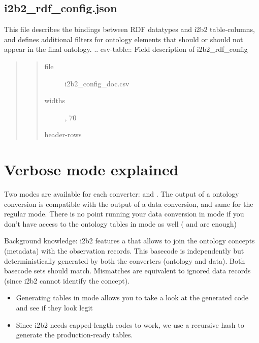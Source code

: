 \documentclass[letterpaper,10pt,english]{sphinxmanual}
\begin{document}
\subsection{i2b2\_rdf\_config.json}
\label{\detokenize{configuration:i2b2-rdf-config-json}}
This file describes the bindings between RDF datatypes and i2b2 table-columns, and defines additional filters for ontology elements that should or should not appear in the final ontology.
.. csv-table:: Field description of i2b2\_rdf\_config
\begin{quote}
\begin{quote}\begin{description}
\item[{file}] \leavevmode
i2b2\_config\_doc.csv

\item[{widths}] , 70

\item[{header-rows}] 

\end{description}\end{quote}
\end{quote}


\section{Verbose mode explained}
\label{\detokenize{verbose:verbose-mode-explained}}\label{\detokenize{verbose:verbose}}\label{\detokenize{verbose::doc}}
Two modes are available for each converter:  and . The output of a  ontology conversion is compatible with the output of a  data conversion, and same for the regular mode.
 There is no point running your data conversion in  mode if you don’t have access to the ontology tables in  mode as well ( and  are enough)

Background knowledge: i2b2 features a  that allows to join the ontology concepts (metadata) with the observation records. This basecode is independently but deterministically generated by both the converters (ontology and data). Both basecode sets should match. Mismatches are equivalent to ignored data records (since i2b2 cannot identify the concept).
\begin{itemize}
\item {} 
Generating tables in  mode allows you to take a look at the generated code and see if they look legit

\item {} 
Since i2b2 needs capped-length codes to work, we use a recursive hash to generate the production-ready tables.

\end{itemize}
\end{document}

